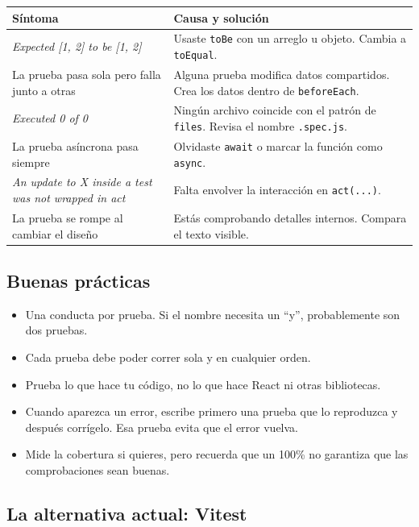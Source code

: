 \documentclass[11pt,a4paper]{article}
\newcommand{\cmd}[1]{\texttt{\color{reactdark}#1}}
\begin{document}
\begin{center}
\small
\begin{tabular}{p{5.4cm} p{8.6cm}}
\toprule
\textbf{Síntoma} & \textbf{Causa y solución} \\
\midrule
\emph{Expected [1, 2] to be [1, 2]} & Usaste \cmd{toBe} con un arreglo u objeto. Cambia a \cmd{toEqual}. \\
\addlinespace
La prueba pasa sola pero falla junto a otras & Alguna prueba modifica datos compartidos. Crea los datos dentro de \cmd{beforeEach}. \\
\addlinespace
\emph{Executed 0 of 0} & Ningún archivo coincide con el patrón de \cmd{files}. Revisa el nombre \cmd{.spec.js}. \\
\addlinespace
La prueba asíncrona pasa siempre & Olvidaste \cmd{await} o marcar la función como \cmd{async}. \\
\addlinespace
\emph{An update to X inside a test was not wrapped in act} & Falta envolver la interacción en \cmd{act(...)}. \\
\addlinespace
La prueba se rompe al cambiar el diseño & Estás comprobando detalles internos. Compara el texto visible. \\
\bottomrule
\end{tabular}
\end{center}

\subsection{Buenas prácticas}

\begin{itemize}
  \item Una conducta por prueba. Si el nombre necesita un ``y'', probablemente son dos pruebas.
  \item Cada prueba debe poder correr sola y en cualquier orden.
  \item Prueba lo que hace tu código, no lo que hace React ni otras bibliotecas.
  \item Cuando aparezca un error, escribe primero una prueba que lo reproduzca y después corrígelo. Esa prueba evita que el error vuelva.
  \item Mide la cobertura si quieres, pero recuerda que un 100\% no garantiza que las comprobaciones sean buenas.
\end{itemize}

\subsection{La alternativa actual: Vitest}\label{sec:vitest}
\end{document}
